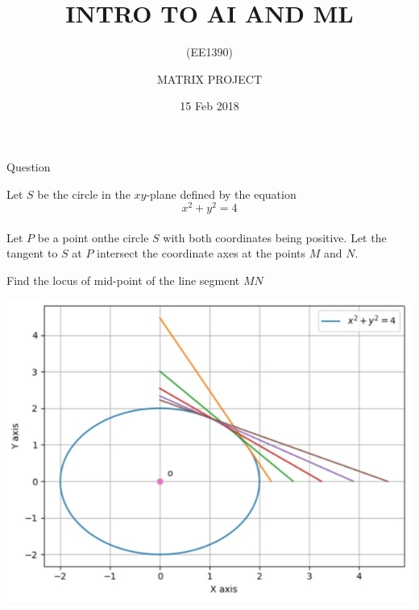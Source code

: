 \documentclass{beamer}
\title{INTRO TO AI AND ML}
\subtitle{(EE1390)}
\author{MATRIX PROJECT}
\date{15 Feb 2018}
\institute{YOGESH.U , GOUTHAM.AGV  \and EE17BTECH11043 , EE17BTECH11001}
\begin{document}
\begin{frame}
\titlepage
\end{frame}

\begin{frame}[t]{Question}

\vspace{2cm}
Let $S$ be the circle in the $xy$-plane defined by the equation \[x^2+y^2=4\]\\
\vspace{0.1cm}
Let $P$ be a point onthe circle $S$ with both coordinates being positive. Let the tangent to $S$ at $P$ intersect the  coordinate axes at the points $M$ and $N$. 

Find the locus of mid-point of the line segment $MN$ 

\end{frame}

\begin{frame}

\includegraphics[scale=0.5]{figure_1-1.png}

\end{frame}
\end{document}
